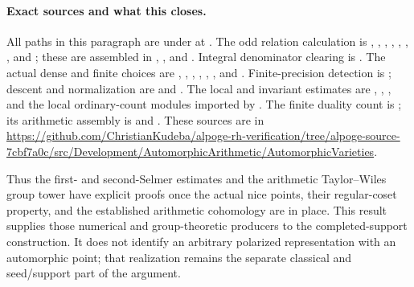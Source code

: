 \paragraph{Exact sources and what this closes.}
All paths in this paragraph are under
at .
The odd relation calculation is
,
, ,
, ,
, ,
and ; these are assembled in
, ,
and .
Integral denominator clearing is .
The actual dense and finite choices are
,
,
, ,
, ,
and .
Finite-precision detection is
;
descent and normalization are
 and .
The local and invariant estimates are
, ,
, and the local ordinary-count
modules imported by .
The finite duality count is ;
its arithmetic assembly is
and .
These sources are in
\url{https://github.com/ChristianKudeba/alpoge-rh-verification/tree/alpoge-source-7cbf7a0c/src/Development/AutomorphicArithmetic/AutomorphicVarieties}.

Thus the first- and second-Selmer estimates and the arithmetic
Taylor--Wiles group tower have explicit proofs once the actual
nice points, their regular-coset property, and the established
arithmetic cohomology are in place.
This result supplies those numerical and group-theoretic
producers to the completed-support construction.
It does not identify an arbitrary polarized representation
with an automorphic point; that realization remains the
separate classical and seed/support part of the argument.
